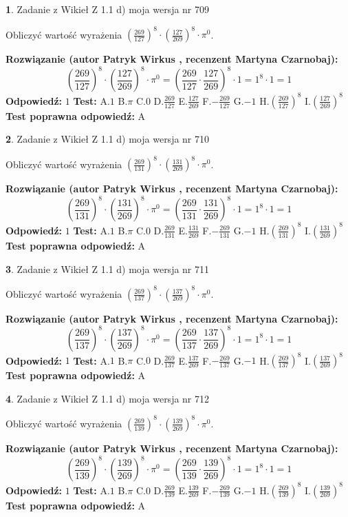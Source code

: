 \documentclass[12pt, a4paper]{article}
\theoremstyle{definition} %
\newtheorem{zad}{}
\newcommand{\zadStart}[1]{\begin{zad}#1\newline}
\newcommand{\zadStop}{\end{zad}}
\newcommand{\rozwStart}[2]{\noindent \textbf{Rozwiązanie (autor #1 , recenzent #2): }\newline}
\newcommand{\rozwStop}{\newline}
\newcommand{\odpStart}{\noindent \textbf{Odpowiedź:}\newline}
\newcommand{\odpStop}{\newline}
\newcommand{\testStart}{\noindent \textbf{Test:}\newline}
\newcommand{\testStop}{\newline}
\newcommand{\kluczStart}{\noindent \textbf{Test poprawna odpowiedź:}\newline}
\newcommand{\kluczStop}{\newline}
\begin{document}
\zadStart{Zadanie z Wikieł Z 1.1 d) moja wersja nr 709}

Obliczyć wartość wyrażenia $(\frac{269}{127})^{8} \cdot (\frac{127}{269})^{8} \cdot \pi^{0}$.
\zadStop
\rozwStart{Patryk Wirkus}{Martyna Czarnobaj}
$$(\frac{269}{127})^{8} \cdot (\frac{127}{269})^{8} \cdot \pi^{0} = (\frac{269}{127} \cdot \frac{127}{269})^{8} \cdot 1 = 1^{8} \cdot 1 = 1$$
\rozwStop
\odpStart
$1$
\odpStop
\testStart
A.$1$ B.$\pi$ C.$0$ D.$\frac{269}{127}$ E.$\frac{127}{269}$
F.$-\frac{269}{127}$ G.$-1$
H.$(\frac{269}{127})^{8}$
I.$(\frac{127}{269})^{8}$
\testStop
\kluczStart
A
\kluczStop



\zadStart{Zadanie z Wikieł Z 1.1 d) moja wersja nr 710}

Obliczyć wartość wyrażenia $(\frac{269}{131})^{8} \cdot (\frac{131}{269})^{8} \cdot \pi^{0}$.
\zadStop
\rozwStart{Patryk Wirkus}{Martyna Czarnobaj}
$$(\frac{269}{131})^{8} \cdot (\frac{131}{269})^{8} \cdot \pi^{0} = (\frac{269}{131} \cdot \frac{131}{269})^{8} \cdot 1 = 1^{8} \cdot 1 = 1$$
\rozwStop
\odpStart
$1$
\odpStop
\testStart
A.$1$ B.$\pi$ C.$0$ D.$\frac{269}{131}$ E.$\frac{131}{269}$
F.$-\frac{269}{131}$ G.$-1$
H.$(\frac{269}{131})^{8}$
I.$(\frac{131}{269})^{8}$
\testStop
\kluczStart
A
\kluczStop



\zadStart{Zadanie z Wikieł Z 1.1 d) moja wersja nr 711}

Obliczyć wartość wyrażenia $(\frac{269}{137})^{8} \cdot (\frac{137}{269})^{8} \cdot \pi^{0}$.
\zadStop
\rozwStart{Patryk Wirkus}{Martyna Czarnobaj}
$$(\frac{269}{137})^{8} \cdot (\frac{137}{269})^{8} \cdot \pi^{0} = (\frac{269}{137} \cdot \frac{137}{269})^{8} \cdot 1 = 1^{8} \cdot 1 = 1$$
\rozwStop
\odpStart
$1$
\odpStop
\testStart
A.$1$ B.$\pi$ C.$0$ D.$\frac{269}{137}$ E.$\frac{137}{269}$
F.$-\frac{269}{137}$ G.$-1$
H.$(\frac{269}{137})^{8}$
I.$(\frac{137}{269})^{8}$
\testStop
\kluczStart
A
\kluczStop



\zadStart{Zadanie z Wikieł Z 1.1 d) moja wersja nr 712}

Obliczyć wartość wyrażenia $(\frac{269}{139})^{8} \cdot (\frac{139}{269})^{8} \cdot \pi^{0}$.
\zadStop
\rozwStart{Patryk Wirkus}{Martyna Czarnobaj}
$$(\frac{269}{139})^{8} \cdot (\frac{139}{269})^{8} \cdot \pi^{0} = (\frac{269}{139} \cdot \frac{139}{269})^{8} \cdot 1 = 1^{8} \cdot 1 = 1$$
\rozwStop
\odpStart
$1$
\odpStop
\testStart
A.$1$ B.$\pi$ C.$0$ D.$\frac{269}{139}$ E.$\frac{139}{269}$
F.$-\frac{269}{139}$ G.$-1$
H.$(\frac{269}{139})^{8}$
I.$(\frac{139}{269})^{8}$
\testStop
\kluczStart
A
\kluczStop
\end{document}
